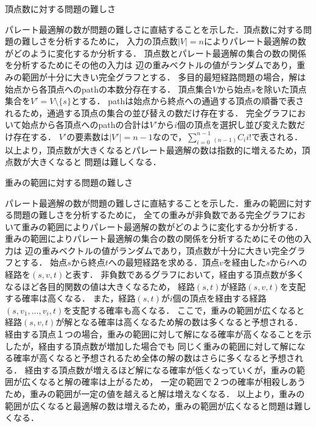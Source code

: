 \documentclass[12pt]{optlab-bachelor}
\begin{document}
\begin{description}
  \item[頂点数に対する問題の難しさ]
\end{description}

パレート最適解の数が問題の難しさに直結することを示した．頂点数に対する問題の難しさを分析するために，
入力の頂点数$|V|=n$によりパレート最適解の数がどのように変化するか分析する．
頂点数とパレート最適解の集合の数の関係を分析するためにその他の入力は
辺の重みベクトルの値がランダムであり，重みの範囲が十分に大きい完全グラフとする．
多目的最短経路問題の場合，解は始点から各頂点へのpathの本数分存在する．
頂点集合$V$から始点$s$を除いた頂点集合を$V'=V \setminus \{s\}$とする．
pathは始点から終点への通過する頂点の順番で表されるため，通過する頂点の集合の並び替えの数だけ存在する．
完全グラフにおいて始点から各頂点へのpathの合計は$V'$から$i$個の頂点を選択し並び変えた数だけ存在する．
$V'$の要素数は$|V'|=n-1$なので，$\displaystyle \sum_{i=0}^{n-1} {}_{(n-1)}C_i i!$で表される．
以上より，頂点数が大きくなるとパレート最適解の数は指数的に増えるため，頂点数が大きくなると
問題は難しくなる．

\begin{description}
  \item[重みの範囲に対する問題の難しさ]
\end{description}

パレート最適解の数が問題の難しさに直結することを示した．重みの範囲に対する問題の難しさを分析するために，
全ての重みが非負数である完全グラフにおいて重みの範囲によりパレート最適解の数がどのように変化するか分析する．
重みの範囲によりパレート最適解の集合の数の関係を分析するためにその他の入力は
辺の重みベクトルの値がランダムであり，頂点数が十分に大きい完全グラフとする．
始点$s$から終点$t$への最短経路を求める．頂点$v$を経由した$s$から$t$への経路を$(s,v,t)$と表す．
非負数であるグラフにおいて，経由する頂点数が多くなるほど各目的関数の値は大きくなるため，
経路$(s,t)$が経路$(s,v,t)$を支配する確率は高くなる．
また，経路$(s,t)$が$i$個の頂点を経由する経路$(s,v_1,\ldots,v_i,t)$を支配する確率も高くなる．
ここで，重みの範囲が広くなると経路$(s,v,t)$が解となる確率は高くなるため解の数は多くなると予想される．
経由する頂点１つの場合，重みの範囲に対して解になる確率が高くなることを示したが，経由する頂点数が増加した場合でも
同じく重みの範囲に対して解になる確率が高くなると予想されるため全体の解の数はさらに多くなると予想される．
経由する頂点数が増えるほど解になる確率が低くなっていくが，重みの範囲が広くなると解の確率は上がるため，
一定の範囲で２つの確率が相殺しあうため，重みの範囲が一定の値を越えると解は増えなくなる．
以上より，重みの範囲が広くなると最適解の数は増えるため，重みの範囲が広くなると問題は難しくなる．
\end{document}
